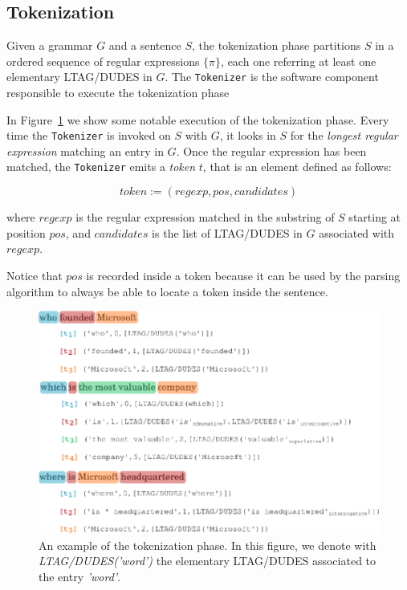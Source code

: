 \subsection{Tokenization}
\label{sec:parsing-tokenization}

Given a grammar $G$ and a sentence $S$, the tokenization phase partitions $S$ in a ordered sequence of regular expressions $\{\pi\}$, each one referring at least one elementary LTAG/DUDES in $G$.
%
The \texttt{Tokenizer} is the software component responsible to execute the tokenization phase

In Figure~\ref{fig:tokenizer-sample} we show some notable execution of the tokenization phase.
%
Every time the \texttt{Tokenizer} is invoked on $S$ with $G$, it looks in $S$ for the \textit{longest regular expression} matching an entry in $G$.
%
Once the regular expression has been matched, the \texttt{Tokenizer} emits a \textit{token} $t$, that is an element defined as follows:

\begin{equation}
\label{eqn:token}
token:=(regexp,pos,candidates)
\end{equation}

where
$regexp$ is the regular expression matched in the substring of $S$ starting at position $pos$, and
$candidates$ is the list of LTAG/DUDES in $G$ associated with $regexp$.

Notice that $pos$ is recorded inside a token because it can be used by the parsing algorithm to always be able to locate a token inside the sentence.

\begin{figure}[tp]
	\centering
	\includegraphics[width=0.8\columnwidth]{./fig/tokenizer-sample}
	\caption{An example of the tokenization phase. In this figure, we denote with \textit{LTAG/DUDES('word')} the elementary LTAG/DUDES associated to the entry \textit{'word'}.}
	\label{fig:tokenizer-sample}
\end{figure}

